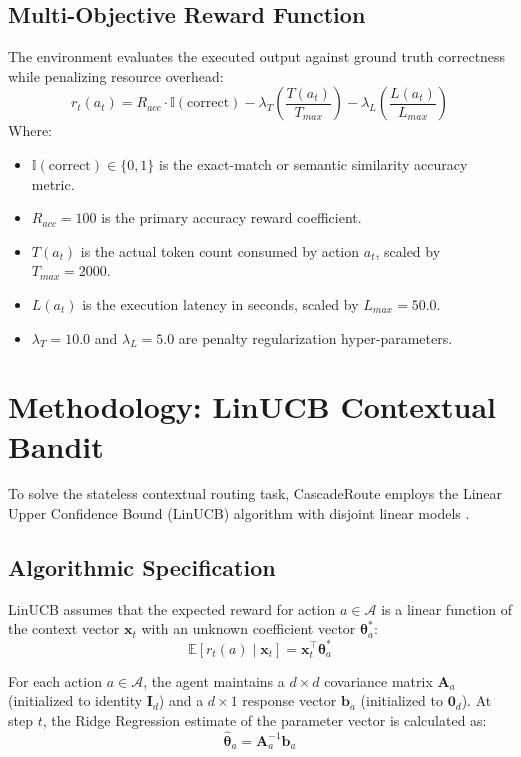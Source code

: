 \documentclass{article}
\begin{document}
\subsection{Multi-Objective Reward Function}
The environment evaluates the executed output against ground truth correctness while penalizing resource overhead:
\begin{equation}
    r_t(a_t) = R_{acc} \cdot \mathbb{I}(\text{correct}) - \lambda_T \left(\frac{T(a_t)}{T_{max}}\right) - \lambda_L \left(\frac{L(a_t)}{L_{max}}\right)
\end{equation}
Where:
\begin{itemize}
    \item $\mathbb{I}(\text{correct}) \in \{0, 1\}$ is the exact-match or semantic similarity accuracy metric.
    \item $R_{acc} = 100$ is the primary accuracy reward coefficient.
    \item $T(a_t)$ is the actual token count consumed by action $a_t$, scaled by $T_{max} = 2000$.
    \item $L(a_t)$ is the execution latency in seconds, scaled by $L_{max} = 50.0$.
    \item $\lambda_T = 10.0$ and $\lambda_L = 5.0$ are penalty regularization hyper-parameters.
\end{itemize}

\section{Methodology: LinUCB Contextual Bandit}
\label{sec:methodology}

To solve the stateless contextual routing task, CascadeRoute employs the Linear Upper Confidence Bound (LinUCB) algorithm with disjoint linear models \cite{linucb2010}. 

\subsection{Algorithmic Specification}
LinUCB assumes that the expected reward for action $a \in \mathcal{A}$ is a linear function of the context vector $\mathbf{x}_t$ with an unknown coefficient vector $\boldsymbol{\theta}_a^*$:
\begin{equation}
    \mathbb{E}[r_t(a) \mid \mathbf{x}_t] = \mathbf{x}_t^\top \boldsymbol{\theta}_a^*
\end{equation}

For each action $a \in \mathcal{A}$, the agent maintains a $d \times d$ covariance matrix $\mathbf{A}_a$ (initialized to identity $\mathbf{I}_d$) and a $d \times 1$ response vector $\mathbf{b}_a$ (initialized to $\mathbf{0}_d$). At step $t$, the Ridge Regression estimate of the parameter vector is calculated as:
\begin{equation}
    \hat{\boldsymbol{\theta}}_a = \mathbf{A}_a^{-1} \mathbf{b}_a
\end{equation}
\end{document}
